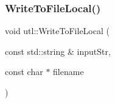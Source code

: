\mbox{\label{namespaceutl_a32ce5d71ca3cd937dab875e706f48a6a}} 
\subsubsection{\texorpdfstring{Write\+To\+File\+Local()}{WriteToFileLocal()}}
{\footnotesize\ttfamily void utl\+::\+Write\+To\+File\+Local (\begin{DoxyParamCaption}\item[{const std\+::string \&}]{input\+Str,  }\item[{const char $\ast$}]{filename }\end{DoxyParamCaption})}

